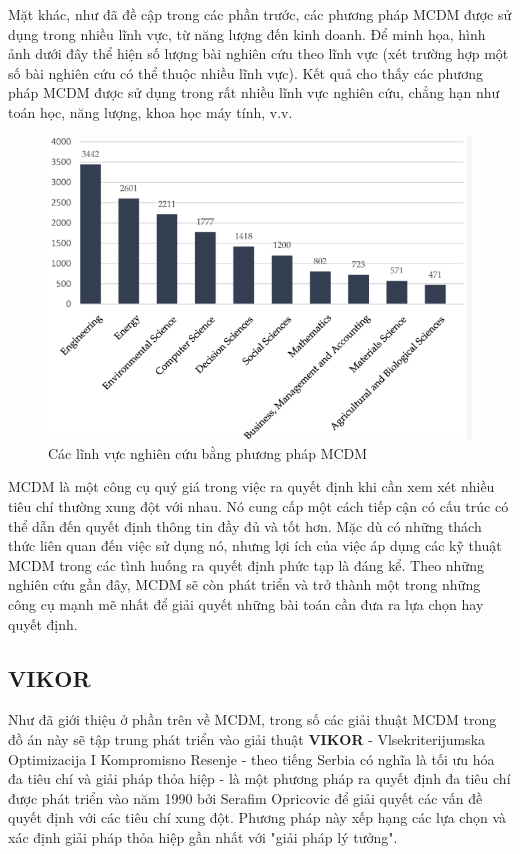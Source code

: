 Mặt khác, như đã đề cập trong các phần trước, các phương pháp MCDM được sử dụng trong nhiều lĩnh vực, từ năng lượng đến kinh doanh. Để minh họa, hình ảnh dưới đây thể hiện số lượng bài nghiên cứu theo lĩnh vực (xét trường hợp một số bài nghiên cứu có thể thuộc nhiều lĩnh vực). Kết quả cho thấy các phương pháp MCDM được sử dụng trong rất nhiều lĩnh vực nghiên cứu, chẳng hạn như toán học, năng lượng, khoa học máy tính, v.v.
\begin{figure}[H]
    \centering
    \includegraphics[width=0.65\linewidth]{images/MCDMarea.png}
    \vspace{0.6cm}
    \caption{Các lĩnh vực nghiên cứu bằng phương pháp MCDM}
\end{figure}

MCDM là một công cụ quý giá trong việc ra quyết định khi cần xem xét nhiều tiêu chí thường xung đột với nhau. Nó cung cấp một cách tiếp cận có cấu trúc có thể dẫn đến quyết định thông tin đầy đủ và tốt hơn. Mặc dù có những thách thức liên quan đến việc sử dụng nó, nhưng lợi ích của việc áp dụng các kỹ thuật MCDM trong các tình huống ra quyết định phức tạp là đáng kể. Theo những nghiên cứu gần đây, MCDM sẽ còn phát triển và trở thành một trong những công cụ mạnh mẽ nhất để giải quyết những bài toán cần đưa ra lựa chọn hay quyết định.

\subsection{VIKOR}

Như đã giới thiệu ở phần trên về MCDM, trong số các giải thuật MCDM trong đồ án này sẽ tập trung phát triển vào giải thuật \textbf{VIKOR} - Vlsekriterijumska Optimizacija I Kompromisno Resenje - theo tiếng Serbia có nghĩa là tối ưu hóa đa tiêu chí và giải pháp thỏa hiệp - là một phương pháp ra quyết định đa tiêu chí được phát triển vào năm 1990 bởi Serafim Opricovic để giải quyết các vấn đề quyết định với các tiêu chí xung đột. Phương pháp này xếp hạng các lựa chọn và xác định giải pháp thỏa hiệp gần nhất với "giải pháp lý tưởng".


